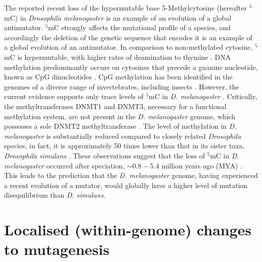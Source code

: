 The reported recent loss of the hypermutable base 5-Methylcytosine (hereafter $^5$mC) in \textit{Drosophila melanogaster} is an example of an evolution of a global antimutator. 
$^5$mC strongly affects the mutational profile of a species, and accordingly the deletion of the genetic sequence that encodes it is an example of a global evolution of an antimutator. In comparison to non-methylated cytosine, $^5$mC is hypermutable, with higher rates of deamination to thymine \citep{Shen1994TheDNA, Coulondre1978MolecularColi}. DNA methylation predominantly occurs on cytosines that precede a guanine nucleotide, known as CpG dinucleotides \citep{Holliday1975DNADevelopment}. CpG methylation has been identified in the genomes of a diverse range of invertebrates, including insects \citep{Wang2010EstimatingLoci}. However, the current evidence supports only trace levels of $^5$mC in \textit{D. melanogaster} \citep{Capuano2014CytosineSpecies, Deshmukh2018LevelsGenome}. Critically, the methyltransferases DNMT1 and DNMT3, necessary for a functional methylation system, are not present in the \textit{D. melanogaster} genome, which possesses a sole DNMT2 methyltransferase \citep{Goll2005EukaryoticMethyltransferases, Tweedie1999VestigesMelanogaster}. The level of methylation in \textit{D. melanogaster} is substantially reduced compared to closely related \textit{Drosophila} species, in fact, it is approximately 50 times lower than that in its sister taxa, \textit{Drosophila simulans} \citep{Deshmukh2018LevelsGenome}. These observations suggest that the loss of $^5$mC in \textit{D. melanogaster} occurred after speciation, $\sim 0.8-5.4$ million years ago (MYA) \citep{Cutter2008DivergenceRate, Wang2010EstimatingLoci, Tamura2004TemporalClocks}. This leads to the prediction that the \textit{D. melanogaster} genome, having experienced a recent evolution of a mutator, would globally have a higher level of mutation disequilibrium than \textit{D. simulans}. 

\section{Localised (within-genome) changes to mutagenesis}

